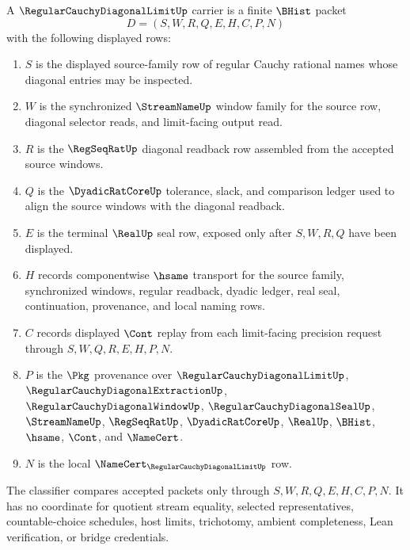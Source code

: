 \begin{definition}
\label{def:regular-cauchy-diagonal-limit-carrier}
A $\RegularCauchyDiagonalLimitUp$ carrier is a finite $\BHist$ packet
$$
D=(S,W,R,Q,E,H,C,P,N)
$$
with the following displayed rows:
\begin{enumerate}
\item $S$ is the displayed source-family row of regular Cauchy rational names whose diagonal entries may be inspected.
\item $W$ is the synchronized $\StreamNameUp$ window family for the source row, diagonal selector reads, and limit-facing output read.
\item $R$ is the $\RegSeqRatUp$ diagonal readback row assembled from the accepted source windows.
\item $Q$ is the $\DyadicRatCoreUp$ tolerance, slack, and comparison ledger used to align the source windows with the diagonal readback.
\item $E$ is the terminal $\RealUp$ seal row, exposed only after $S,W,R,Q$ have been displayed.
\item $H$ records componentwise $\hsame$ transport for the source family, synchronized windows, regular readback, dyadic ledger, real seal, continuation, provenance, and local naming rows.
\item $C$ records displayed $\Cont$ replay from each limit-facing precision request through $S,W,Q,R,E,H,P,N$.
\item $P$ is the $\Pkg$ provenance over $\RegularCauchyDiagonalLimitUp$, $\RegularCauchyDiagonalExtractionUp$, $\RegularCauchyDiagonalWindowUp$, $\RegularCauchyDiagonalSealUp$, $\StreamNameUp$, $\RegSeqRatUp$, $\DyadicRatCoreUp$, $\RealUp$, $\BHist$, $\hsame$, $\Cont$, and $\NameCert$.
\item $N$ is the local $\NameCert_{\RegularCauchyDiagonalLimitUp}$ row.
\end{enumerate}
The classifier compares accepted packets only through $S,W,R,Q,E,H,C,P,N$. It has no coordinate for quotient stream equality, selected representatives, countable-choice schedules, host limits, trichotomy, ambient completeness, Lean verification, or bridge credentials.
\end{definition}

